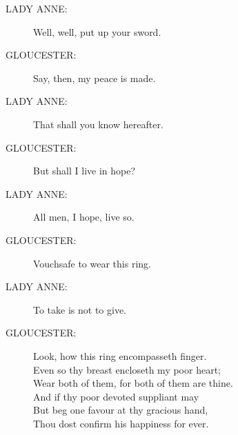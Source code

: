 \documentclass{article}
\begin{document}
\begin{description}
\item[LADY ANNE:] 
\hspace{1pt}Well, well, put up your sword.\\
\end{description}
\begin{description}
\item[GLOUCESTER:] 
\hspace{1pt}Say, then, my peace is made.\\
\end{description}
\begin{description}
\item[LADY ANNE:] 
\hspace{1pt}That shall you know hereafter.\\
\end{description}
\begin{description}
\item[GLOUCESTER:] 
\hspace{1pt}But shall I live in hope?\\
\end{description}
\begin{description}
\item[LADY ANNE:] 
\hspace{1pt}All men, I hope, live so.\\
\end{description}
\begin{description}
\item[GLOUCESTER:] 
\hspace{1pt}Vouchsafe to wear this ring.\\
\end{description}
\begin{description}
\item[LADY ANNE:] 
\hspace{1pt}To take is not to give.\\
\end{description}
\begin{description}
\item[GLOUCESTER:] 
\hspace{1pt}Look, how this ring encompasseth finger.\\
\hspace{1pt}Even so thy breast encloseth my poor heart;\\
\hspace{1pt}Wear both of them, for both of them are thine.\\
\hspace{1pt}And if thy poor devoted suppliant may\\
\hspace{1pt}But beg one favour at thy gracious hand,\\
\hspace{1pt}Thou dost confirm his happiness for ever.\\
\end{description}
\end{document}
